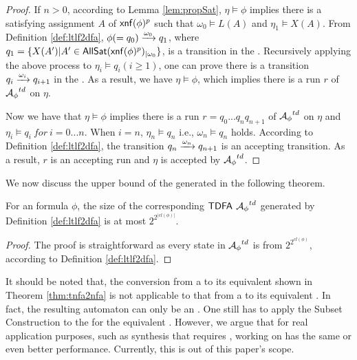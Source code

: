\begin{proof}
If $n>0$, according to Lemma \ref{lem:propSat}, $\eta\models\phi$ implies there is a satisfying assignment $A$ of ${\sf xnf}(\phi)^p$ such that $\omega_0\models L(A)$ and $\eta_1\models X(A)$. From Definition \ref{def:ltlf2dfa}, $\phi (=q_0)\xrightarrow[]{\omega_0}q_1$, where $q_1=\{X(A') | A'\in{\sf AllSat}({\sf xnf}(\phi)^p)_{|\omega_0}\}$, is a transition in the \TDFA. Recursively applying the above process to $\eta_i\models q_i(i\geq 1)$, one can prove there is a transition $q_i\xrightarrow[]{\omega_i}q_{i+1}$ in the \TDFA. As a result, we have $\eta\models\phi$, which implies there is a run $r$ of ${\mathcal{A}_{\phi}}^{td}$ on $\eta$.  

Now we have that $\eta\models\phi$ implies there is a run $r=q_0...q_n q_{n+1}$ of ${\mathcal{A}_{\phi}}^{td}$ on $\eta$ and $\eta_i\models q_i\ for\ i=0...n$. When $i=n$, $\eta_n\models q_n$ i.e., $\omega_n\models q_n$ holds. According to Definition \ref{def:ltlf2dfa}, the transition $q_n\xrightarrow[]{\omega_n}q_{n+1}$ is an accepting transition. As a result, $r$ is an accepting run and $\eta$ is accepted by ${\mathcal{A}_{\phi}}^{td}$.
\end{proof}

We now discuss the upper bound of the generated \TDFA in the following theorem.

\begin{theorem}\label{thm:tdfaBound}
For an \ltlf formula $\phi$, the size of the corresponding ${\sf TDFA}$ ${\mathcal{A}_{\phi}}^{td}$ generated by Definition \ref{def:ltlf2dfa} is at most $2^{2^{|cl(\phi)|}}$.
\end{theorem}
\begin{proof}
	The proof is straightforward as every state in ${\mathcal{A}_{\phi}}^{td}$ is from $2^{2^{cl(\phi)}}$, according to Definition \ref{def:ltlf2dfa}.
\end{proof}

It should be noted that, the conversion from a \TNFA to its equivalent \NFA shown in Theorem \ref{thm:tnfa2nfa} is not applicable to that from a \TDFA to its equivalent \DFA. In fact, the resulting automaton can only be an \NFA. One still has to apply the Subset Construction to the \NFA for the equivalent \DFA. However, we argue that for real application purposes, such as \ltlf synthesis that requires \DFA, working on \TDFA has the same or even better performance. Currently, this is out of this paper's scope.  

